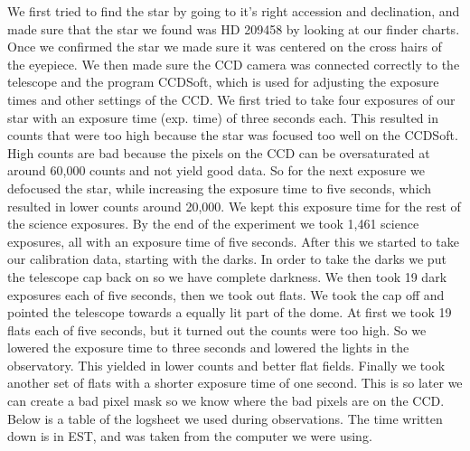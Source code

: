 \documentclass{aastex61}
\begin{document}
We first tried to find the star by going to it's right accession and declination, and made sure that the star we found was HD 209458 by looking at our finder charts. Once we confirmed the star we made sure it was centered on the cross hairs of the eyepiece. We then made sure the CCD camera was connected correctly to the telescope and the program CCDSoft, which is used for adjusting the exposure times and other settings of the CCD. We first tried to take four exposures of our star with an exposure time (exp. time) of three seconds each. This resulted in counts that were too high because the star was focused too well on the CCDSoft. High counts are bad because the pixels on the CCD can be oversaturated at around 60,000 counts and not yield good data. So for the next exposure we defocused the star, while increasing the exposure time to five seconds, which resulted in lower counts around 20,000. We kept this exposure time for the rest of the science exposures. By the end of the experiment we took 1,461 science exposures, all with an exposure time of five seconds. After this we started to take our calibration data, starting with the darks. In order to take the darks we put the telescope cap back on so we have complete darkness. We then took 19 dark exposures each of five seconds, then we took out flats. We took the cap off and pointed the telescope towards a equally lit part of the dome. At first we took 19 flats each of five seconds, but it turned out the counts were too high. So we lowered the exposure time to three seconds and lowered the lights in the observatory. This yielded in lower counts and better flat fields. Finally we took another set of flats with a shorter exposure time of one second. This is so later we can create a bad pixel mask so we know where the bad pixels are on the CCD. Below is a table of the logsheet we used during observations. The time written down is in EST, and was taken from the computer we were using. 
\end{document}
